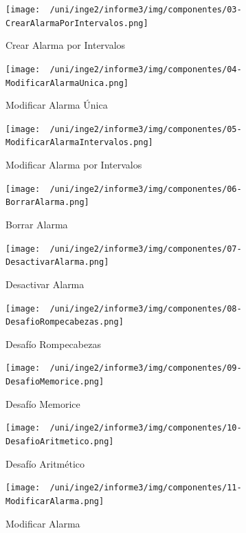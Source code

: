 \begin{figure}[H]
	\centering
	\texttt{[image: ~/uni/inge2/informe3/img/componentes/03-CrearAlarmaPorIntervalos.png]}
	\caption{Crear Alarma por Intervalos}
        \vspace{5pt}
	\label{fig:Crear Alarma por Intervalos}
\end{figure}

\begin{figure}[H]
	\centering
	\texttt{[image: ~/uni/inge2/informe3/img/componentes/04-ModificarAlarmaUnica.png]}
	\caption{Modificar Alarma Única}
        \vspace{5pt}
	\label{fig:Modificar Alarma Única}
\end{figure}

\begin{figure}[H]
	\centering
	\texttt{[image: ~/uni/inge2/informe3/img/componentes/05-ModificarAlarmaIntervalos.png]}
	\caption{Modificar Alarma por Intervalos}
        \vspace{5pt}
	\label{fig:Modificar Alarma por Intervalos}
\end{figure}

\begin{figure}[H]
	\centering
	\texttt{[image: ~/uni/inge2/informe3/img/componentes/06-BorrarAlarma.png]}
	\caption{Borrar Alarma}
        \vspace{5pt}
	\label{fig:Borrar Alarma}
\end{figure}

\begin{figure}[H]
	\centering
	\texttt{[image: ~/uni/inge2/informe3/img/componentes/07-DesactivarAlarma.png]}
	\caption{Desactivar Alarma}
        \vspace{5pt}
	\label{fig:Desactivar Alarma}
\end{figure}

\begin{figure}[H]
	\centering
	\texttt{[image: ~/uni/inge2/informe3/img/componentes/08-DesafioRompecabezas.png]}
	\caption{Desafío Rompecabezas}
        \vspace{5pt}
	\label{fig:Desafío Rompecabezas}
\end{figure}

\begin{figure}[H]
	\centering
	\texttt{[image: ~/uni/inge2/informe3/img/componentes/09-DesafioMemorice.png]}
	\caption{Desafío Memorice}
        \vspace{5pt}
	\label{fig:Desafío Memorice}
\end{figure}

\begin{figure}[H]
	\centering
	\texttt{[image: ~/uni/inge2/informe3/img/componentes/10-DesafioAritmetico.png]}
	\caption{Desafío Aritmético}
        \vspace{5pt}
	\label{fig:Desafío Aritmético}
\end{figure}

\begin{figure}[H]
	\centering
	\texttt{[image: ~/uni/inge2/informe3/img/componentes/11-ModificarAlarma.png]}
	\caption{Modificar Alarma}
        \vspace{5pt}
	\label{fig:Modificar Alarma}
\end{figure}

